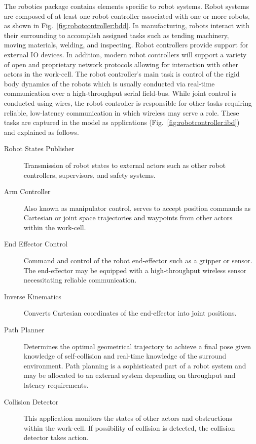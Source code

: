 \documentclass[journal, twoside]{IEEEtran}
\begin{document}
	The robotics package contains elements specific to robot systems.  Robot systems are composed of at least one robot controller associated with one or more robots, as shown in Fig.~\ref{fig:robotcontroller:bdd}.  In manufacturing, robots interact with their surrounding to accomplish assigned tasks such as tending machinery, moving materials, welding, and inspecting. Robot controllers provide support for external IO devices.  In addition, modern robot controllers will support a variety of open and proprietary network protocols allowing for interaction with other actors in the work-cell.  The robot controller's main task is control of the rigid body dynamics of the robots which is usually conducted via real-time communication over a high-throughput serial field-bus. While joint control is conducted using wires, the robot controller is responsible for other tasks requiring reliable, low-latency communication in which wireless may serve a role.  These tasks are captured in the model as applications (Fig.~\ref{fig:robotcontroller:ibd}) and explained as follows.
	
	\begin{description}
		
		\item[Robot States Publisher] Transmission of robot states to external actors such as other robot controllers, supervisors, and safety systems.
		
		\item[Arm Controller] Also known as manipulator control, serves to accept position commands as Cartesian or joint space trajectories and waypoints from other actors within the work-cell.
		
		\item[End Effector Control] Command and control of the robot end-effector such as a gripper or sensor.  The end-effector may be equipped with a high-throughput wireless sensor necessitating reliable communication.
		
		\item[Inverse Kinematics] Converts Cartesian coordinates of the end-effector into joint positions.
		
		\item[Path Planner] Determines the optimal geometrical trajectory to achieve a final pose given knowledge of self-collision and real-time knowledge of the surround environment.  Path planning is a sophisticated part of a robot system and may be allocated to an external system depending on throughput and latency requirements.
		
		\item[Collision Detector] This application monitors the states of other actors and obstructions within the work-cell. If possibility of collision is detected, the collision detector takes action.
		
	\end{description} 
	
\end{document}
